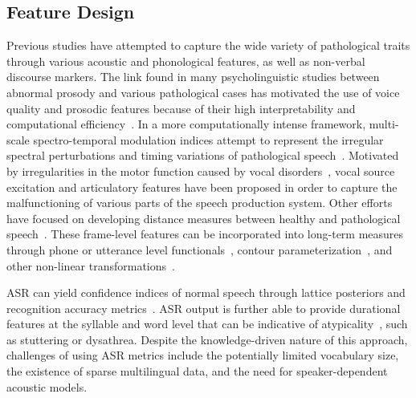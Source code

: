 \documentclass{article}
\begin{document}
\subsection{Feature Design}
Previous studies have attempted to capture the wide variety of pathological traits through various acoustic and phonological features, as well as non-verbal discourse markers.
The link found in many psycholinguistic studies between abnormal prosody and various pathological cases has motivated the use of voice quality and prosodic features because of their high interpretability and computational efficiency~\cite{van2010computational,tsanas2012novel}. In a more computationally intense framework, multi-scale spectro-temporal modulation indices attempt to represent the irregular spectral perturbations and timing variations of pathological speech~\cite{liss2010discriminating,falk2012characterization}. Motivated by irregularities in the motor function caused by vocal disorders~\cite{falk2012characterization,hahm2015parkinson}, vocal source excitation and articulatory features have been proposed in order to capture the malfunctioning of various parts of the speech production system. Other efforts have focused on developing distance measures between healthy and pathological speech~\cite{gu2005disordered}. These frame-level features can be incorporated into long-term measures through phone or utterance level functionals~\cite{kim2015automatic}, contour parameterization~\cite{kim2015automatic2}, and other non-linear transformations~\cite{kim2015automatic,an2015automatic}.

ASR can yield confidence indices of normal speech through lattice posteriors and recognition accuracy metrics~\cite{kim2015automatic,zlotnik2015random}. 
ASR output is further able to provide durational features at the syllable and word level that can be indicative of atypicality~\cite{an2015automatic}, such as stuttering or dysathrea. 
Despite the knowledge-driven nature of this approach, challenges of using ASR metrics include the potentially limited vocabulary size, the existence of sparse multilingual data, and the need for speaker-dependent acoustic models.
\end{document}
